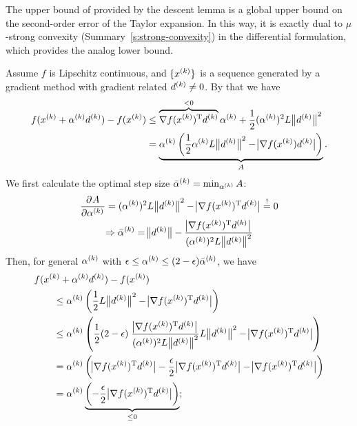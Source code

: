 \documentclass{article}
\begin{document}
The upper bound of provided by the descent lemma is a global upper bound on the second-order error
of the Taylor expansion.  In this way, it is exactly dual to \(\mu\)-strong convexity
(Summary~\ref{s:strong-convexity}) in the differential formulation, which provides the analog
lower bound.


\label{s:convergence-constant}

Assume \(f\) is Lipschitz continuous, and \(\{x^{(k)}\}\) is a sequence generated by a gradient
method with gradient related \(d^{(k)} \neq 0\).  By that we have
\begin{align*}
  f(\kth{x} + \kth{\alpha}\kth{d}) - f(\kth{x})
  &\leq \overbrace{\T{\nabla f(\kth{x})} \kth{d}}^{< 0} \kth{\alpha} +
    \frac{1}{2} (\kth{\alpha})^2 L \enVert[1]{\kth{d}}^2 \\
  &= \underbrace{\kth{\alpha} \left( \frac{1}{2} \kth{\alpha} L \enVert[1]{\kth{d}}^2
    - \envert[1]{\nabla f(\kth{x}) \kth{d}} \right)}_{A}.
\end{align*}
We first calculate the optimal step size \(\bar{\alpha}^{(k)} = \min_{\alpha^{(k)}} A\):
\begin{gather*}
  \dpd{A}{{\kth{\alpha}}} = (\kth{\alpha})^2 L \enVert[1]{\kth{d}}^2 - \envert[1]{\T{\nabla
                            f(\kth{x})} \kth{d}} \overset{!}{=} 0 \\
  \Rightarrow \kth{\bar{\alpha}} = \enVert[1]{\kth{d}} - \frac{\envert[1]{\T{\nabla
                       f(\kth{x})} \kth{d}}}{(\kth{\alpha})^2 L \enVert[1]{\kth{d}}^2}
\end{gather*}
Then, for general \(\alpha^{(k)}\) with
\(\epsilon \leq \alpha^{(k)} \leq (2 - \epsilon)\bar{\alpha}^{(k)}\), we have
\begin{align*}
  &f(\kth{x} + \kth{\alpha}\kth{d}) - f(\kth{x}) \\
  &\qquad \leq \kth{\alpha} \left( \frac{1}{2} L \enVert[1]{\kth{d}}^2
    - \envert[1]{\T{\nabla f(\kth{x})} \kth{d}} \right) \\
  &\qquad \leq \kth{\alpha} \left( \frac{1}{2} (2 - \epsilon)\; \frac{\envert[1]{\T{\nabla
    f(\kth{x})} \kth{d}}}{(\kth{\alpha})^2 L \enVert[1]{\kth{d}}^2} L \enVert[1]{\kth{d}}^2
    - \envert[1]{\T{\nabla f(\kth{x})} \kth{d}} \right) \\
  &\qquad = \kth{\alpha} \left( \envert[1]{\T{\nabla f(\kth{x})} \kth{d}}
    - \frac{\epsilon}{2} \envert[1]{\T{\nabla f(\kth{x})} \kth{d}}
    - \envert[1]{\T{\nabla f(\kth{x})} \kth{d}} \right) \\
  &\qquad = \kth{\alpha} \underbrace{\left( -\frac{\epsilon}{2}\envert[1]{\T{\nabla f(\kth{x})} \kth{d}}
    \right)}_{\leq 0};
\end{align*}
\end{document}
